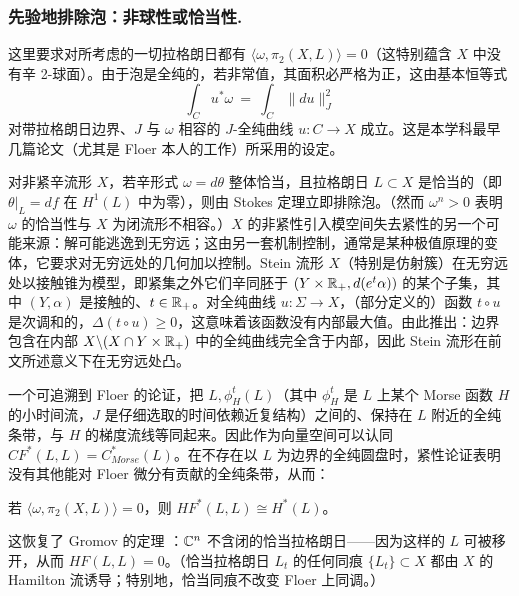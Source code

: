 \subsubsection{先验地排除泡：非球性或恰当性.\label{Sec:exact}} 这里要求对所考虑的一切拉格朗日都有 $\langle \omega, \pi_2(X,L)\rangle = 0$（这特别蕴含 $X$ 中没有辛 2-球面）。由于泡是全纯的，若非常值，其面积必严格为正，这由基本恒等式
\[
\int_C u^*\omega \ = \ \int_C \| du\|_J^2
\] 
对带拉格朗日边界、$J$ 与 $\omega$ 相容的 $J$-全纯曲线 $u: C \rightarrow X$ 成立。这是本学科最早几篇论文（尤其是 Floer 本人的工作）所采用的设定。

对非紧辛流形 $X$，若辛形式 $\omega = d\theta$ 整体恰当，且拉格朗日 $L\subset X$ 是恰当的（即 $\theta|_L = df$ 在 $H^1(L)$ 中为零），则由 Stokes 定理立即排除泡。（然而 $\omega^n > 0$ 表明 $\omega$ 的恰当性与 $X$ 为闭流形不相容。）$X$ 的非紧性引入模空间失去紧性的另一个可能来源：解可能逃逸到无穷远；这由另一套机制控制，通常是某种极值原理的变体，它要求对无穷远处的几何加以控制。Stein 流形 $X$（特别是仿射簇）在无穷远处以接触锥为模型，即紧集之外它们辛同胚于 $(Y\times \mathbb{R}_+, d(e^t\alpha))$ 的某个子集，其中 $(Y,\alpha)$ 是接触的、$t\in\mathbb{R}_+$。对全纯曲线 $u: \Sigma \rightarrow X$，（部分定义的）函数 $t\circ u$ 是次调和的，$\Delta(t\circ u) \geq 0$，这意味着该函数没有内部最大值。由此推出：边界包含在内部 $X \backslash (X \cap Y\times\mathbb{R}_+)$ 中的全纯曲线完全含于内部，因此 Stein 流形在前文所述意义下在无穷远处凸。

一个可追溯到 Floer 的论证，把 $L, \phi_H^t(L)$（其中 $\phi_H^t$ 是 $L$ 上某个 Morse 函数 $H$ 的小时间流，$J$ 是仔细选取的时间依赖近复结构）之间的、保持在 $L$ 附近的全纯条带，与 $H$ 的梯度流线等同起来。因此作为向量空间可以认同 $CF^*(L,L) = C^*_{Morse}(L)$。在不存在以 $L$ 为边界的全纯圆盘时，紧性论证表明没有其他能对 Floer 微分有贡献的全纯条带，从而：

\begin{Theorem}[Floer] \label{Lem:Floer}
若 $\langle \omega, \pi_2(X,L) \rangle = 0$，则 $HF^*(L,L) \cong H^*(L)$。
\end{Theorem}

这恢复了 Gromov 的定理 \cite{Gromov}：$\mathbb{C}^n$ 不含闭的恰当拉格朗日——因为这样的 $L$ 可被移开，从而 $HF(L,L)=0$。（恰当拉格朗日 $L_t$ 的任何同痕 $\{L_t\} \subset X$ 都由 $X$ 的 Hamilton 流诱导；特别地，恰当同痕不改变 Floer 上同调。）

